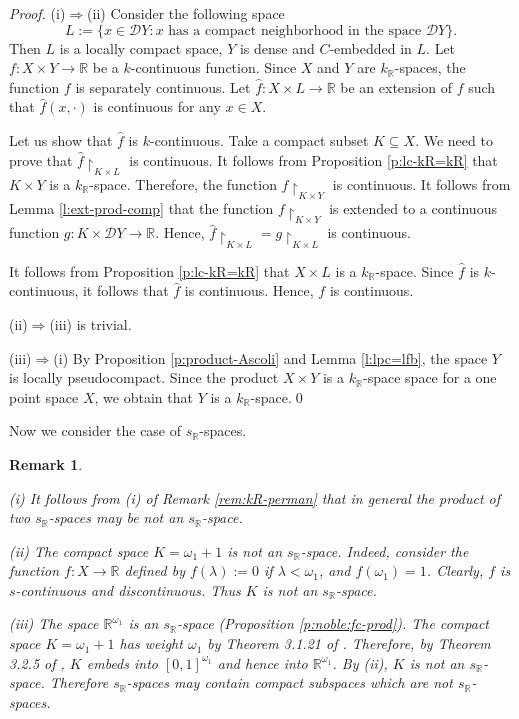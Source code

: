 \documentclass[preprint,11pt]{elsarticle}
\newtheorem{remark}[theorem]{Remark}
\numberwithin{equation}{section}
\numberwithin{theorem}{section}
\newcommand{\w}{\omega}
\newcommand{\IR}{\mathbb{R}}
\newcommand{\DD}{\mathcal{D}}
\begin{document}
\begin{proof}
(i)$\Rightarrow$(ii) Consider the following space
\[
L:=\{x \in \DD Y: x \mbox{  has a compact neighborhood in the space } \DD Y\}.
\]
Then $L$ is a locally compact space, $Y$ is dense and $C$-embedded in $L$.
Let $f: X\times Y\to\IR$ be a $k$-continuous function. Since $X$ and $Y$ are $k_\IR$-spaces, the function $f$ is separately continuous. Let $\hat f: X\times L\to \IR$ be an extension of $f$ such that $\hat f(x,\cdot)$ is continuous for any $x\in X$.

Let us show that $\hat f$ is $k$-continuous. Take a compact subset $K\subseteq X$. We need to prove that $\hat f{\restriction}_{K \times L}$ is continuous. It follows from Proposition \ref{p:lc-kR=kR} that $K\times Y$ is a $k_\IR$-space. Therefore, the function $f{\restriction}_{K\times Y}$ is continuous.
It follows from Lemma \ref{l:ext-prod-comp} that the function $f{\restriction}_{K\times Y}$ is extended to a continuous function $g: K\times \DD Y\to \IR$. Hence, $\hat f{\restriction}_{K \times L}=g{\restriction}_{K \times L}$ is continuous.

It follows from Proposition \ref{p:lc-kR=kR} that $ X\times L$ is a $k_\IR$-space. Since $\hat f$ is $k$-continuous, it follows that $\hat f$ is continuous. Hence, $f$ is continuous.

(ii)$\Rightarrow$(iii) is trivial.

(iii)$\Rightarrow$(i) By Proposition \ref{p:product-Ascoli} and Lemma \ref{l:lpc=lfb}, the space $Y$ is locally pseudocompact. Since the product $X\times Y$ is a $k_\IR$-space space for a one point space $X$, we obtain that  $Y$ is a $k_\IR$-space.\qed
\end{proof}


Now we consider the case of $s_\IR$-spaces.

\begin{remark} \label{rem:sR-perman} {\em
(i) It follows from (i) of Remark \ref{rem:kR-perman} that in general the product of two $s_\IR$-spaces may be not an $s_\IR$-space.

(ii) The compact space $K=\w_1+1$ is not an $s_\IR$-space. Indeed, consider the function $f:X\to \IR$ defined by $f(\lambda):=0$ if $\lambda<\w_1$, and  $f(\w_1)=1$. Clearly, $f$ is $s$-continuous and discontinuous. Thus $K$ is not an $s_\IR$-space. %



(iii) The space $\IR^{\w_1}$ is an $s_\IR$-space (Proposition \ref{p:noble:fc-prod}). The compact space $K=\w_1+1$ has weight $\w_1$ by Theorem 3.1.21 of \cite{Eng}. Therefore, by Theorem 3.2.5 of \cite{Eng},  $K$ embeds into $[0,1]^{\w_1}$  and hence into $\IR^{\w_1}$. By (ii), $K$ is not  an $s_\IR$-space. Therefore  $s_\IR$-spaces may contain compact subspaces which are not  $s_\IR$-spaces.
}
\end{remark}
\end{document}
